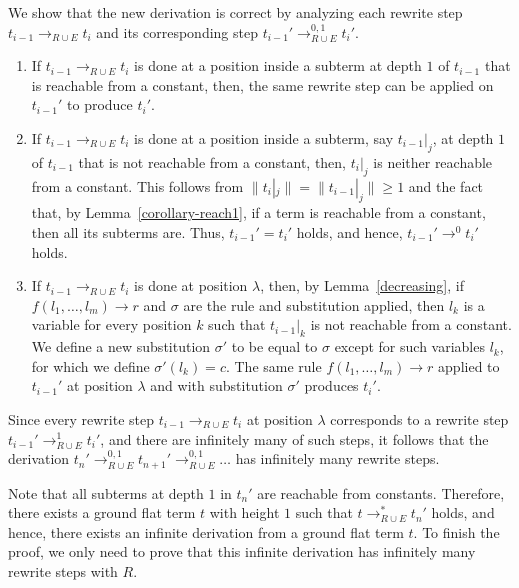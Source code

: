 \documentclass{LMCS}
\theoremstyle{plain}
\begin{document}
We show that the new derivation is correct by analyzing each
rewrite step $t_{i-1}\rightarrow_{R\cup E} t_i$ and its corresponding
step $t_{i-1}'\rightarrow_{R\cup E}^{0,1} t_i'$. 
\begin{enumerate}[(1)]
\item If $t_{i-1}\rightarrow_{R\cup E} t_i$
is done at a position inside a subterm at depth $1$ of $t_{i-1}$
that is reachable from a constant, then, the same rewrite
step can be applied on $t_{i-1}'$ to produce $t_i'$.
\item
If $t_{i-1}\rightarrow_{R\cup E} t_i$
is done at a position inside a subterm, say $t_{i-1}|_j$,
at depth $1$ of $t_{i-1}$
that is not reachable from a constant, then,
$t_i|_j$ is neither reachable from a constant.
This follows from $\|t_i|_j\|=\|t_{i-1}|_j\|\geq 1$
and the fact that, by Lemma~\ref{corollary-reach1},
if a term is reachable from a constant, then all
its subterms are. Thus, $t_{i-1}'=t_i'$ holds, and
hence, $t_{i-1}'\rightarrow^0 t_i'$ holds.
\item
If $t_{i-1}\rightarrow_{R\cup E} t_i$
is done at position $\lambda$, then, by Lemma~\ref{decreasing},
if $f(l_1,\ldots,l_m)\rightarrow r$ and $\sigma$ are the rule
and substitution applied,
then $l_k$ is a variable for 
every position $k$ such that $t_{i-1}|_k$ 
is not reachable from a constant.
We define a new substitution $\sigma'$
to be equal to $\sigma$ except for such variables $l_k$,
for which we define $\sigma'(l_k)=c$. The same rule
$f(l_1,\ldots,l_m)\rightarrow r$ applied to $t_{i-1}'$
at position $\lambda$ and with substitution $\sigma'$
produces $t_i'$.
\end{enumerate}
Since every rewrite step $t_{i-1}\rightarrow_{R\cup E} t_i$
at position $\lambda$ corresponds to a rewrite step
$t_{i-1}'\rightarrow_{R\cup E}^1 t_i'$, and there are infinitely many of
such steps, it follows that the derivation
$t_n'\rightarrow_{R\cup E}^{0,1} t_{n+1}'\rightarrow_{R\cup E}^{0,1}\ldots$
has infinitely many rewrite steps.

Note that all subterms at depth $1$ in $t_n'$
are reachable from constants. Therefore,
there exists a ground flat term $t$ with height $1$ such that
$t\rightarrow_{R\cup E}^* t_n'$ holds, and hence, there exists
an infinite derivation from a ground flat term $t$.
To finish the proof, we only need to prove that this
infinite derivation has infinitely many rewrite steps with $R$.
\end{document}
